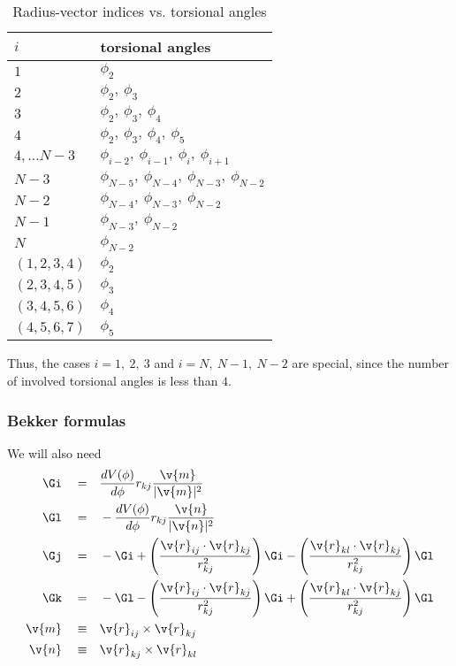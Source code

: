 \begin{table}
  \centering
  \caption{Radius-vector indices vs. torsional angles}
  \begin{tabular}{|p{3cm}|p{5cm}|}
\hline
$i$ 	& 	torsional angles \\
\hline
  $1$	&	$\phi_2$ \\
  $2$	&	$\phi_2,\ \phi_3$ \\
  $3$	&	$\phi_2,\ \phi_3,\ \phi_4$ \\
  $4$	&	$\phi_2,\ \phi_3,\ \phi_4,\ \phi_5$ \\
  $4,\ldots N-3$	&	$\phi_{i-2},\ \phi_{i-1},\ \phi_i,\ \phi_{i+1}$ \\
  $N-3$		& $\phi_{N-5},\ \phi_{N-4},\ \phi_{N-3},\ \phi_{N-2}$	\\
  $N-2$		& $\phi_{N-4},\ \phi_{N-3},\ \phi_{N-2}$	\\
  $N-1$		& $\phi_{N-3},\ \phi_{N-2}$			\\
  $N$		& $\phi_{N-2}$		\\
  $(1,2,3,4)$	& $\phi_2$ \\
  $(2,3,4,5)$	& $\phi_3$ \\
  $(3,4,5,6)$	& $\phi_4$ \\
  $(4,5,6,7)$	& $\phi_5$ \\
\hline
  \end{tabular}
\end{table}
Thus, the cases $i=1,\ 2,\ 3$ and $i=N,\ N-1,\ N-2$ are special, since the number
of involved torsional angles is less than $4$. 

\subsubsection{Bekker formulas}

We will also need \cite{Bekker95}
\begin{align}
  \Gi\quad=&\quad \frac{dV(\phi)}{d\phi}r_{kj}\frac{\v{m}}{|\v{m}|^2}\\
  \Gl\quad=&\quad-\frac{dV(\phi)}{d\phi}r_{kj}\frac{\v{n}}{|\v{n}|^2}\\
\Gj\quad=&\quad-\Gi +\left(\frac{\v{r}_{ij}\cdot{\v{r}_{kj}}}{r_{kj}^2}\right)\Gi
  -\left(\frac{\v{r}_{kl}\cdot{\v{r}_{kj}}}{r_{kj}^2}\right)\Gl\\
  \Gk\quad=&\quad-\Gl
  -\left(\frac{\v{r}_{ij}\cdot{\v{r}_{kj}}}{r_{kj}^2}\right)\Gi
  +\left(\frac{\v{r}_{kl}\cdot{\v{r}_{kj}}}{r_{kj}^2}\right)\Gl\\
\v{m}\quad\equiv&\quad\v{r}_{ij}\times\v{r}_{kj}\\
\v{n}\quad\equiv&\quad\v{r}_{kj}\times\v{r}_{kl}
\end{align}

